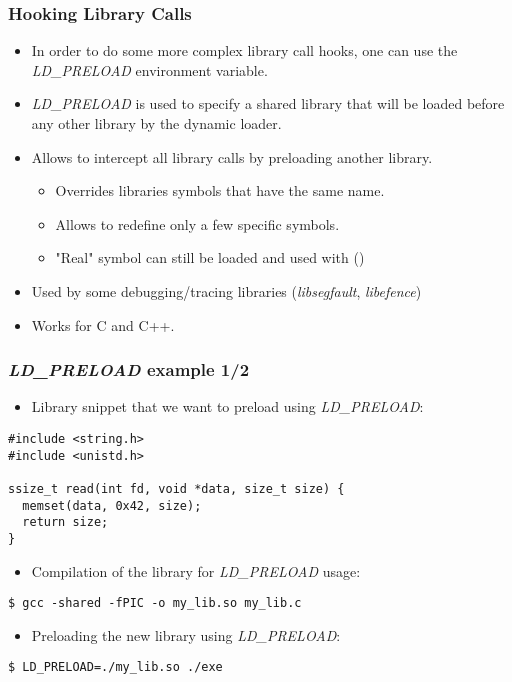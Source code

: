 \begin{frame}
  \frametitle{Hooking Library Calls}
  \begin{itemize}
    \item In order to do some more complex library call hooks, one can use
          the {\em LD\_PRELOAD} environment variable.
    \item {\em LD\_PRELOAD} is used to specify a shared library that will be
          loaded before any other library by the dynamic loader.
    \item Allows to intercept all library calls by preloading another library.
    \begin{itemize}
      \item Overrides libraries symbols that have the same name.
      \item Allows to redefine only a few specific symbols.
      \item "Real" symbol can still be loaded and used with  ()
    \end{itemize}
    \item Used by some debugging/tracing libraries ({\em libsegfault},
          {\em libefence})
    \item Works for C and C++.
  \end{itemize}
\end{frame}

\begin{frame}[fragile]
  \frametitle{{\em LD\_PRELOAD} example 1/2}
  \begin{itemize}
    \item Library snippet that we want to preload using {\em LD\_PRELOAD}:
  \end{itemize}
  \begin{block}{}
    \begin{verbatim}
#include <string.h>
#include <unistd.h>

ssize_t read(int fd, void *data, size_t size) {
  memset(data, 0x42, size);
  return size;
}
    \end{verbatim}
  \end{block}
  \begin{itemize}
    \item Compilation of the library for {\em LD\_PRELOAD} usage:
  \end{itemize}
  \begin{block}{}
    \begin{verbatim}
$ gcc -shared -fPIC -o my_lib.so my_lib.c
    \end{verbatim}
  \end{block}

  \begin{itemize}
    \item Preloading the new library using {\em LD\_PRELOAD}:
  \end{itemize}
  \begin{block}{}
    \begin{verbatim}
$ LD_PRELOAD=./my_lib.so ./exe
    \end{verbatim}
  \end{block}
\end{frame}


